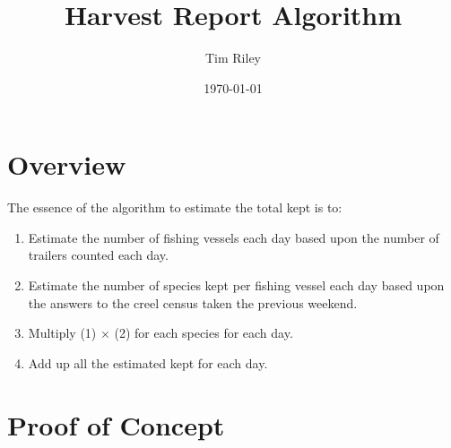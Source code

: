 \documentclass[letterpaper,12pt]{article}
\title{Harvest Report Algorithm}
\author{Tim Riley}
\date{\today}
\begin{document}
\maketitle

\section{Overview}

The essence of the algorithm to estimate the total kept is to:
\begin{enumerate}
\item Estimate the number of fishing vessels each day based upon the number of trailers
counted each day.
\item Estimate the number of species kept per fishing vessel each day
	based upon the answers to the creel census taken the previous weekend.
\item Multiply (1) $\times$ (2) for each species for each day.
\item Add up all the estimated kept for each day.
\end {enumerate}

\section{Proof of Concept}
\end{document}
